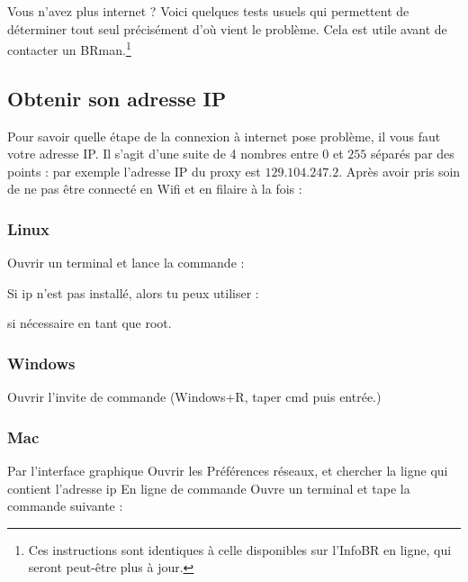 \label{diagnostic}
Vous n'avez plus internet ? Voici quelques tests usuels qui permettent de déterminer tout seul précisément d'où vient le problème. Cela est utile avant de contacter un BRman.\footnote{Ces instructions sont identiques à celle disponibles sur l'InfoBR en ligne, qui seront peut-être plus à jour.}

\subsection{Obtenir son adresse IP}
Pour savoir quelle étape de la connexion à internet pose problème, il vous faut votre adresse IP. Il s'agit d'une suite de 4 nombres entre $0$ et $255$ séparés par des points : par exemple l'adresse IP du proxy est $129.104.247.2$. Après avoir pris soin de ne pas être connecté en Wifi et en filaire à la fois :

\subsubsection{Linux}
Ouvrir un terminal et lance la commande :


Si ip n'est pas installé, alors tu peux utiliser :

si nécessaire en tant que root.
 
\subsubsection{Windows}
Ouvrir l'invite de commande (Windows+R, taper cmd puis entrée.)

 
\subsubsection{Mac}
Par l'interface graphique
Ouvrir les Préférences réseaux, et chercher la ligne qui contient l'adresse ip
En ligne de commande
Ouvre un terminal et tape la commande suivante :

